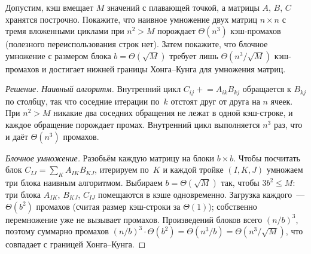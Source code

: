 \begin{problem}
\label{prob:cache-blocking}
Допустим, кэш вмещает $M$ значений с плавающей точкой, а матрицы $A$,
$B$, $C$ хранятся построчно. Покажите, что наивное умножение двух
матриц $n \times n$ с тремя вложенными циклами при $n^2 > M$
порождает $\Theta(n^3)$ кэш-промахов (полезного переиспользования
строк нет). Затем покажите, что блочное умножение с размером блока
$b = \Theta(\sqrt{M})$ требует лишь $\Theta(n^3 / \sqrt{M})$
кэш-промахов и достигает нижней границы Хонга--Кунга для умножения
матриц.
\end{problem}

\begin{proof}[Решение]
\emph{Наивный алгоритм.} Внутренний цикл $C_{ij} \mathrel{+}= A_{ik} B_{kj}$
обращается к $B_{kj}$ по столбцу, так что соседние итерации по~$k$
отстоят друг от друга на $n$ ячеек. При $n^2 > M$ никакие два
соседних обращения не лежат в одной кэш-строке, и каждое обращение
порождает промах. Внутренний цикл выполняется $n^3$ раз, что и даёт
$\Theta(n^3)$ промахов.

\emph{Блочное умножение.} Разобьём каждую матрицу на блоки $b \times b$.
Чтобы посчитать блок $C_{IJ} = \sum_K A_{IK} B_{KJ}$, итерируем по~$K$
и каждой тройке $(I, K, J)$ умножаем три блока наивным алгоритмом.
Выбираем $b = \Theta(\sqrt{M})$ так, чтобы $3 b^2 \le M$: три блока
$A_{IK}$, $B_{KJ}$, $C_{IJ}$ помещаются в кэше одновременно. Загрузка
каждого~--- $\Theta(b^2)$ промахов (считая размер кэш-строки за
$\Theta(1)$); собственно перемножение уже не вызывает промахов.
Произведений блоков всего $(n / b)^3$, поэтому суммарно промахов
$(n / b)^3 \cdot \Theta(b^2) = \Theta(n^3 / b) = \Theta(n^3 / \sqrt{M})$,
что совпадает с границей Хонга--Кунга.
\end{proof}
